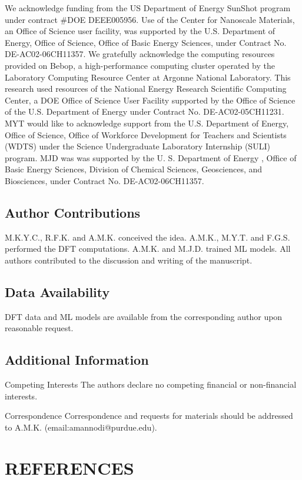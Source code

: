 \documentclass[]{revtex4-2}
\begin{document}
\begin{addendum}

We acknowledge funding from the US Department of Energy SunShot program under contract #DOE DEEE005956. Use of the Center for Nanoscale Materials, an Office of Science user facility, was supported by the U.S. Department of Energy, Office of Science, Office of Basic Energy Sciences, under Contract No. DE-AC02-06CH11357. We gratefully acknowledge the computing resources provided on Bebop, a high-performance computing cluster operated by the Laboratory Computing Resource Center at Argonne National Laboratory. This research used resources of the National Energy Research Scientific Computing Center, a DOE Office of Science User Facility supported by the Office of Science of the U.S. Department of Energy under Contract No. DE-AC02-05CH11231. MYT would like to acknowledge support from the U.S. Department of Energy, Office of Science, Office of Workforce Development for Teachers and Scientists (WDTS) under the Science Undergraduate Laboratory Internship (SULI) program. MJD was was supported by the U. S. Department of Energy , Office of Basic Energy Sciences, Division of Chemical Sciences, Geosciences, and Biosciences, under Contract No. DE-AC02-06CH11357.

\subsection*{Author Contributions} M.K.Y.C., R.F.K. and A.M.K. conceived the idea. A.M.K., M.Y.T. and F.G.S. performed the DFT computations. A.M.K. and M.J.D. trained ML models. All authors contributed to the discussion and writing of the manuscript.

\subsection*{Data Availability} DFT data and ML models are available from the corresponding author upon reasonable request.


\subsection*{Additional Information}

\item[Competing Interests] The authors declare no competing financial or non-financial interests.
 
\item[Correspondence] Correspondence and requests for materials
should be addressed to A.M.K. (email:amannodi@purdue.edu).
\end{addendum}





\section*{REFERENCES}



\end{document}
